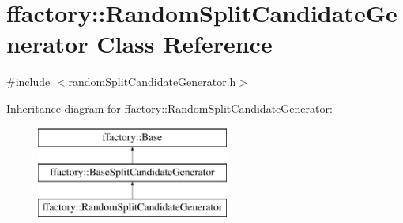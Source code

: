 \hypertarget{classffactory_1_1_random_split_candidate_generator}{\section{ffactory\-:\-:Random\-Split\-Candidate\-Generator Class Reference}
\label{classffactory_1_1_random_split_candidate_generator}
}


{\ttfamily \#include $<$random\-Split\-Candidate\-Generator.\-h$>$}

Inheritance diagram for ffactory\-:\-:Random\-Split\-Candidate\-Generator\-:\begin{figure}[H]
\begin{center}
\leavevmode
\includegraphics[height=3.000000cm]{classffactory_1_1_random_split_candidate_generator}
\end{center}
\end{figure}
